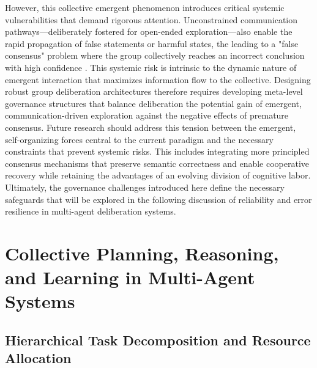 \documentclass[11pt,a4paper]{article}
\begin{document}
However, this collective emergent phenomenon introduces critical systemic vulnerabilities that demand rigorous attention. Unconstrained communication pathways---deliberately fostered for open-ended exploration---also enable the rapid propagation of false statements or harmful states, the leading to a "false consensus" problem where the group collectively reaches an incorrect conclusion with high confidence \cite{arxiv:2404.04834v1}. This systemic risk is intrinsic to the dynamic nature of emergent interaction that maximizes information flow to the collective. Designing robust group deliberation architectures therefore requires developing meta-level governance structures that balance deliberation the potential gain of emergent, communication-driven exploration against the negative effects of premature consensus. Future research should address this tension between the emergent, self-organizing forces central to the current paradigm and the necessary constraints that prevent systemic risks. This includes integrating more principled consensus mechanisms that preserve semantic correctness and enable cooperative recovery \cite{arxiv:1210.7035v1} while retaining the advantages of an evolving division of cognitive labor. Ultimately, the governance challenges introduced here define the necessary safeguards that will be explored in the following discussion of reliability and error resilience in multi-agent deliberation systems.


\section{Collective Planning, Reasoning, and Learning in Multi-Agent Systems}



\subsection{Hierarchical Task Decomposition and Resource Allocation}
\end{document}
